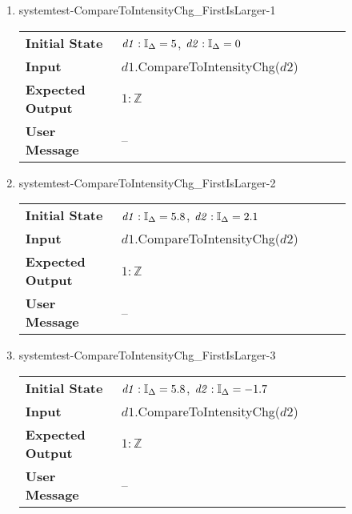 \begin{enumerate}
    \item{systemtest-CompareToIntensityChg\_FirstIsLarger-1}
    \begin{table}[H]
        \centering
        \begin{tabular}{P{0.25\linewidth}P{0.6\linewidth}}
            \toprule
            \textbf{Initial State} & $\mathit{d1} : \mathbb{I}_{\Delta} = 5$,
            $\mathit{d2} : \mathbb{I}_{\Delta} = 0$ \\
            \textbf{Input} & $\mathit{d1}$.CompareToIntensityChg($\mathit{d2}$)
            \\ \midrule
            \textbf{Expected Output} & $1 : \mathbb{Z}$ \\
            \textbf{User Message} & -- \\ \bottomrule
        \end{tabular}
    \end{table}

    \item{systemtest-CompareToIntensityChg\_FirstIsLarger-2}
    \begin{table}[H]
        \centering
        \begin{tabular}{P{0.25\linewidth}P{0.6\linewidth}}
            \toprule
            \textbf{Initial State} & $\mathit{d1} : \mathbb{I}_{\Delta} = 5.8$,
            $\mathit{d2} : \mathbb{I}_{\Delta} = 2.1$ \\
            \textbf{Input} & $\mathit{d1}$.CompareToIntensityChg($\mathit{d2}$)
            \\ \midrule
            \textbf{Expected Output} & $1 : \mathbb{Z}$ \\
            \textbf{User Message} & -- \\ \bottomrule
        \end{tabular}
    \end{table}

    \item{systemtest-CompareToIntensityChg\_FirstIsLarger-3}
    \begin{table}[H]
        \centering
        \begin{tabular}{P{0.25\linewidth}P{0.6\linewidth}}
            \toprule
            \textbf{Initial State} & $\mathit{d1} : \mathbb{I}_{\Delta} = 5.8$,
            $\mathit{d2} : \mathbb{I}_{\Delta} = -1.7$ \\
            \textbf{Input} & $\mathit{d1}$.CompareToIntensityChg($\mathit{d2}$)
            \\ \midrule
            \textbf{Expected Output} & $1 : \mathbb{Z}$ \\
            \textbf{User Message} & -- \\ \bottomrule
        \end{tabular}
    \end{table}


\end{enumerate}
